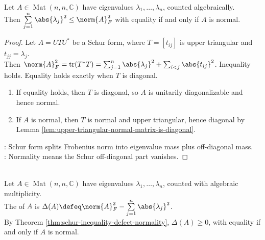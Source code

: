 \begin{theorem} \label{thm:schur-inequality-defect-normality}\label{thm:schur-inequality-normal-defect} \\
Let $A\in\operatorname{Mat}(n,n,\mathbb{C})$ have eigenvalues $\lambda_1,\ldots,\lambda_n$, counted algebraically.\\
Then $\sum\limits_{j=1}^{n}\abs{\lambda_j}^2\leq\norm{A}_F^2$ with equality if and only if $A$ is normal.
\begin{proof}
Let $A=UTU^*$ be a Schur form, where $T=[t_{ij}]$ is upper triangular and $t_{jj}=\lambda_j$.\\
Then $\norm{A}_F^2=\operatorname{tr}(T^*T)=\sum_{j=1}^{n}\abs{\lambda_j}^2+\sum_{i<j}\abs{t_{ij}}^2$.
Inequality holds. Equality holds exactly when $T$ is diagonal.
\begin{enumerate}[label=\roman*.]
\setlength{\itemsep}{0pt}
\item[$(\Rightarrow)$] If equality holds, then $T$ is diagonal, so $A$ is unitarily diagonalizable and hence normal.
\item[$(\Leftarrow)$] If $A$ is normal, then $T$ is normal and upper triangular, hence diagonal by Lemma \ref{lem:upper-triangular-normal-matrix-is-diagonal}.
\end{enumerate}
: Schur form splits Frobenius norm into eigenvalue mass plus off-diagonal mass.\\
: Normality means the Schur off-diagonal part vanishes.
\end{proof}
\end{theorem}

\begin{definition} \label{def:defect-from-normality} \\
Let $A\in\operatorname{Mat}(n,n,\mathbb{C})$ have eigenvalues $\lambda_1,\ldots,\lambda_n$, counted with algebraic multiplicity.\\
The  of $A$ is $\Delta(A)\defeq\norm{A}_F^2-\sum\limits_{j=1}^{n}\abs{\lambda_j}^2$.\\
By Theorem \ref{thm:schur-inequality-defect-normality}, $\Delta(A)\geq0$, with equality if and only if $A$ is normal.
\end{definition}


